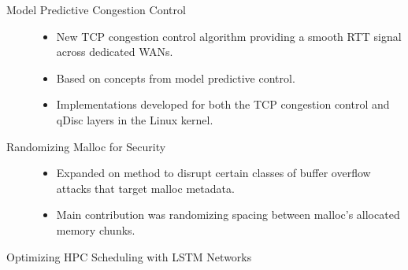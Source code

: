 \documentclass[11pt,a4paper]{moderncv}
\begin{document}
\begin{description}
    \item[Model Predictive Congestion Control] \hfill

        \begin{itemize}
        \item New TCP congestion control algorithm providing a smooth
          RTT signal across dedicated WANs.

        \item Based on concepts from model predictive control.

        \item Implementations developed for both the TCP congestion
          control and qDisc layers in the Linux kernel.
        \end{itemize}

    \item[Randomizing Malloc for Security] \hfill

        \begin{itemize}
        \item Expanded on method to disrupt certain classes of buffer
          overflow attacks that target malloc metadata.

        \item Main contribution was randomizing spacing between
          malloc's allocated memory chunks.
        \end{itemize}

      \item[Optimizing HPC Scheduling with LSTM Networks] \hfill


\end{description}
\end{document}
